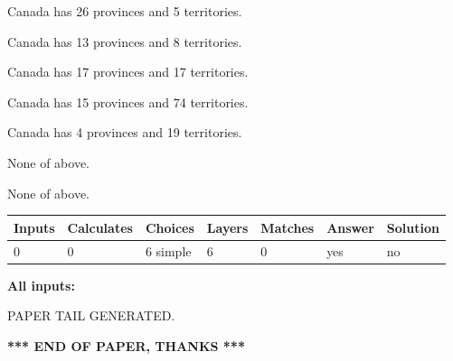\documentclass[12pt]{article}
\begin{document}
 
Canada has  26 provinces and  5 territories.
 
 
Canada has  13 provinces and  8 territories.
 
 
Canada has  17 provinces and  17 territories.
 
 
Canada has  15 provinces and  74 territories.
 
 
Canada has   4 provinces and  19 territories.
 
 
 None of above.
 
 
\noindent{}
 
 
 None of above.
 
 
\noindent{}
 
 
   
   
   
   
\noindent\begin{tabular}{|l|l|l|l|l|l|l|}
 \hline
Inputs & Calculates & Choices & Layers & Matches & Answer & Solution \\ \hline
 0  & 
 0  & 
 6
  simple  
  & 
 6  & 
 0  & 
  yes & 
  no 
  \\ \hline
 \end{tabular}
   
   
   
   
\noindent{}
   
   
   
   
\noindent\vspace{0.1in}\hspace{-0.08in} {\textbf{\Large{All inputs: }}}
   
   
   
   
   
   
 \vspace{0.2in}
 
   
   
\vspace{2.0in} PAPER TAIL GENERATED.
   
   
   
   
\vspace{1.0in} 
{\textbf{\large{ *** END OF PAPER, THANKS *** }}} 
   
\end{document}
